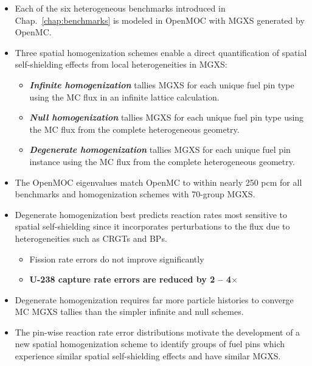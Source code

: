 \vfill
\begin{highlightsbox}[frametitle=Highlights]
\begin{itemize}
  \item Each of the six heterogeneous benchmarks introduced in Chap.~\ref{chap:benchmarks} is modeled in OpenMOC with \ac{MGXS} generated by OpenMC.
  \item Three spatial homogenization schemes enable a direct quantification of spatial self-shielding effects from local heterogeneities in \ac{MGXS}:
  \begin{itemize}
    \item \textbf{\textit{Infinite homogenization}} tallies \ac{MGXS} for each unique fuel pin type using the \ac{MC} flux in an infinite lattice calculation.
    \item \textbf{\textit{Null homogenization}} tallies \ac{MGXS} for each unique fuel pin type using the \ac{MC} flux from the complete heterogeneous geometry.
    \item \textbf{\textit{Degenerate homogenization}} tallies \ac{MGXS} for each unique fuel pin instance using the \ac{MC} flux from the complete heterogeneous geometry.
  \end{itemize}
  \item The OpenMOC eigenvalues match OpenMC to within nearly 250 \ac{pcm} for all benchmarks and homogenization schemes with 70-group \ac{MGXS}.
  \item Degenerate homogenization best predicts reaction rates most sensitive to spatial self-shielding since it incorporates perturbations to the flux due to heterogeneities such as \acp{CRGT} and \acp{BP}.
  \begin{itemize}
    \item Fission rate errors do not improve significantly
    \item \textbf{U-238 capture rate errors are reduced by 2 -- 4$\times$}
  \end{itemize}
  \item Degenerate homogenization requires far more particle histories to converge \ac{MC} \ac{MGXS} tallies than the simpler infinite and null schemes.
  \item The pin-wise reaction rate error distributions motivate the development of a new spatial homogenization scheme to identify groups of fuel pins which experience similar spatial self-shielding effects and have similar \ac{MGXS}.
\end{itemize}
\end{highlightsbox}
\vfill